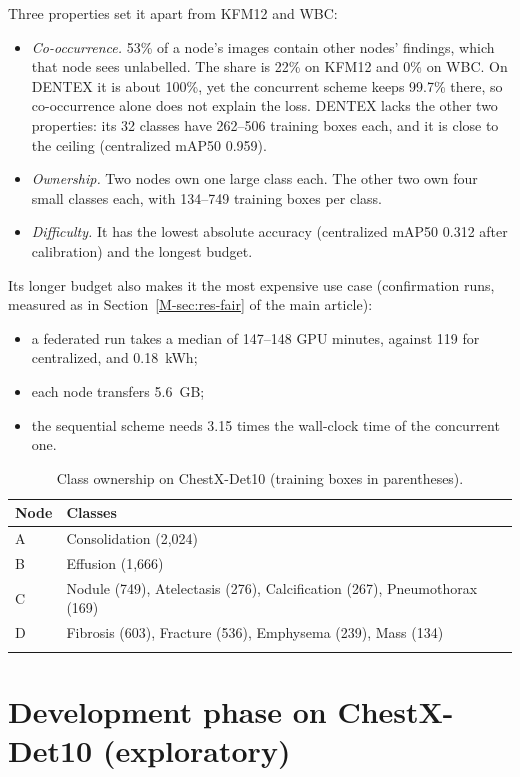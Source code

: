 \documentclass[pdflatex,sn-mathphys-num]{sn-jnl}
\begin{document}
Three properties set it apart from KFM12 and WBC:
\begin{itemize}
\item \emph{Co-occurrence.} 53\% of a node's images contain other nodes' findings, which that node sees unlabelled. The share is 22\% on KFM12 and 0\% on WBC. On DENTEX it is about 100\%, yet the concurrent scheme keeps 99.7\% there, so co-occurrence alone does not explain the loss. DENTEX lacks the other two properties: its 32 classes have 262--506 training boxes each, and it is close to the ceiling (centralized mAP50 0.959).
\item \emph{Ownership.} Two nodes own one large class each. The other two own four small classes each, with 134--749 training boxes per class.
\item \emph{Difficulty.} It has the lowest absolute accuracy (centralized mAP50 0.312 after calibration) and the longest budget.
\end{itemize}
Its longer budget also makes it the most expensive use case (confirmation runs, measured as in Section~\ref{M-sec:res-fair} of the main article):
\begin{itemize}
\item a federated run takes a median of 147--148 GPU minutes, against 119 for centralized, and 0.18~kWh;
\item each node transfers 5.6~GB;
\item the sequential scheme needs 3.15 times the wall-clock time of the concurrent one.
\end{itemize}

\begin{table}[h]
\caption{Class ownership on ChestX-Det10 (training boxes in parentheses).}\label{tab:s-owners}
\footnotesize
\begin{tabular*}{\textwidth}{@{\extracolsep\fill}ll}
\toprule
Node & Classes \\
\midrule
A & Consolidation (2,024) \\
B & Effusion (1,666) \\
C & Nodule (749), Atelectasis (276), Calcification (267), Pneumothorax (169) \\
D & Fibrosis (603), Fracture (536), Emphysema (239), Mass (134) \\
\botrule
\end{tabular*}
\end{table}

\section{Development phase on ChestX-Det10 (exploratory)}\label{sec:s-dev}
\end{document}
